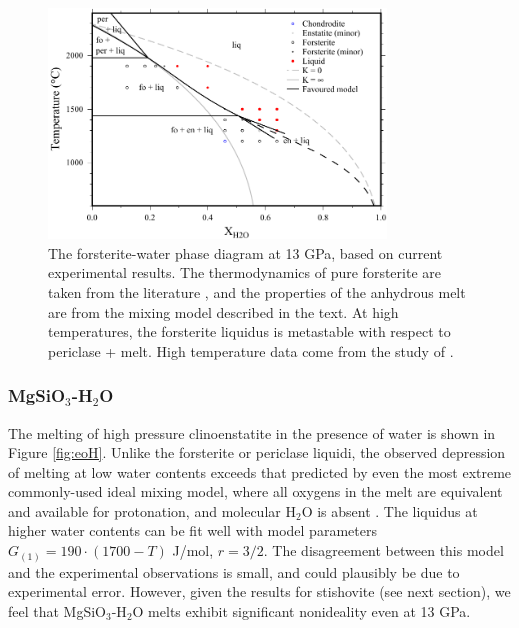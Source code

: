 \documentclass[review]{elsarticle}
\begin{document}
\begin{figure}[ht!]
  \centering
      \includegraphics[width=0.8\textwidth]{figures/forsterite}
      \caption{The forsterite-water phase diagram at 13 GPa, based on current experimental results. The thermodynamics of pure forsterite are taken from the literature \citep{SLB2011}, and the properties of the anhydrous melt are from the mixing model described in the text. At high temperatures, the forsterite liquidus is metastable with respect to periclase + melt. High temperature data come from the study of \cite{NDMPMF2016}.}
  \label{fig:foH}
\end{figure}
\clearpage


\subsubsection{MgSiO$_3$-H$_2$O}
The melting of high pressure clinoenstatite in the presence of water is shown in Figure \ref{fig:eoH}. Unlike the forsterite or periclase liquidi, the observed depression of melting at low water contents exceeds that predicted by even the most extreme commonly-used ideal mixing model, where all oxygens in the melt are equivalent and available for protonation, and molecular H$_2$O is absent \citep{SS1985}. The liquidus at higher water contents can be fit well with model parameters $G_{(1)} = 190 \cdot (1700-T)$ J/mol, $r=3/2$. The disagreement between this model and the experimental observations is small, and could plausibly be due to experimental error. However, given the results for stishovite (see next section), we feel that MgSiO$_3$-H$_2$O melts exhibit significant nonideality even at 13 GPa. 
\end{document}
